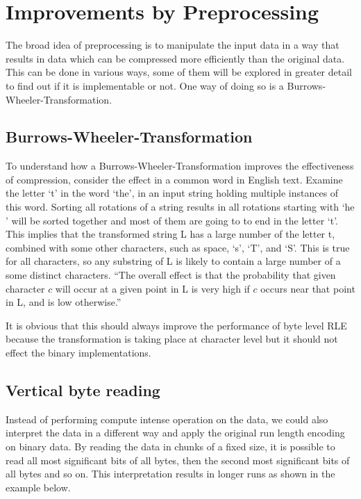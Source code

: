 \section{Improvements by Preprocessing}
\label{ch:Analysis:sec:Improvements by Preprocessing}

The broad idea of preprocessing is to manipulate the input data in a way that results in data which can be compressed more efficiently than the original data. This can be done in various ways, some of them will be explored in greater detail to find out if it is implementable or not. One way of doing so is a Burrows-Wheeler-Transformation.

\subsection{Burrows-Wheeler-Transformation}
\label{ch:Analysis:sec:Improvements by Preprocessing:subSec:bwt}
\par{
To understand how a Burrows-Wheeler-Transformation improves the effectiveness of compression, consider the effect in a common word in English text. Examine the letter ‘t’ in the word ‘the’, in an input string holding multiple instances of this word.
Sorting all rotations of a string results in all rotations starting with ‘he ’ will be sorted together and most of them are going to to end in the letter ‘t’. This implies that the transformed string L has a large number of the letter t, combined with some other characters, such as space, ‘s’, ‘T’, and ‘S’. This is true for all characters, so any substring of L is likely to contain a large number of a some distinct characters. \enquote{The overall effect is that the probability that given character $c$ will occur at a given
point in L is very high if $c$ occurs near that point in L, and is low otherwise.} \cite{Burrows94}
}

\par{
It is obvious that this should always improve the performance of byte level RLE because the transformation is taking place at character level but it should not effect the binary implementations. 
}

\subsection{Vertical byte reading}
\par{
Instead of performing compute intense operation on the data, we could also interpret the data in a different way and apply the original run length encoding on binary data. By reading the data in chunks of a fixed size, it is possible to read all most significant bits of all bytes, then the second most significant bits of all bytes and so on. This interpretation results in longer runs as shown in the example below.
}


